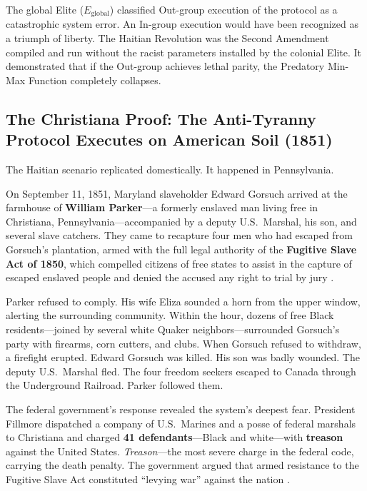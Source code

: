 The global Elite ($E_{\text{global}}$) classified Out-group execution of the protocol as a catastrophic system error. An In-group execution would have been recognized as a triumph of liberty. The Haitian Revolution was the Second Amendment compiled and run without the racist parameters installed by the colonial Elite. It demonstrated that if the Out-group achieves lethal parity, the Predatory Min-Max Function completely collapses.

\subsection{The Christiana Proof: The Anti-Tyranny Protocol Executes on American Soil (1851)}

The Haitian scenario replicated domestically. It happened in Pennsylvania.

On September 11, 1851, Maryland slaveholder Edward Gorsuch arrived at the farmhouse of \textbf{William Parker}---a formerly enslaved man living free in Christiana, Pennsylvania---accompanied by a deputy U.S.\ Marshal, his son, and several slave catchers. They came to recapture four men who had escaped from Gorsuch's plantation, armed with the full legal authority of the \textbf{Fugitive Slave Act of 1850}, which compelled citizens of free states to assist in the capture of escaped enslaved people and denied the accused any right to trial by jury \cite{christiana_history, christiana_zinn}.

Parker refused to comply. His wife Eliza sounded a horn from the upper window, alerting the surrounding community. Within the hour, dozens of free Black residents---joined by several white Quaker neighbors---surrounded Gorsuch's party with firearms, corn cutters, and clubs. When Gorsuch refused to withdraw, a firefight erupted. Edward Gorsuch was killed. His son was badly wounded. The deputy U.S.\ Marshal fled. The four freedom seekers escaped to Canada through the Underground Railroad. Parker followed them.

The federal government's response revealed the system's deepest fear. President Fillmore dispatched a company of U.S.\ Marines and a posse of federal marshals to Christiana and charged \textbf{41 defendants}---Black and white---with \textbf{treason} against the United States. \textit{Treason}---the most severe charge in the federal code, carrying the death penalty. The government argued that armed resistance to the Fugitive Slave Act constituted ``levying war'' against the nation \cite{christiana_history}.

